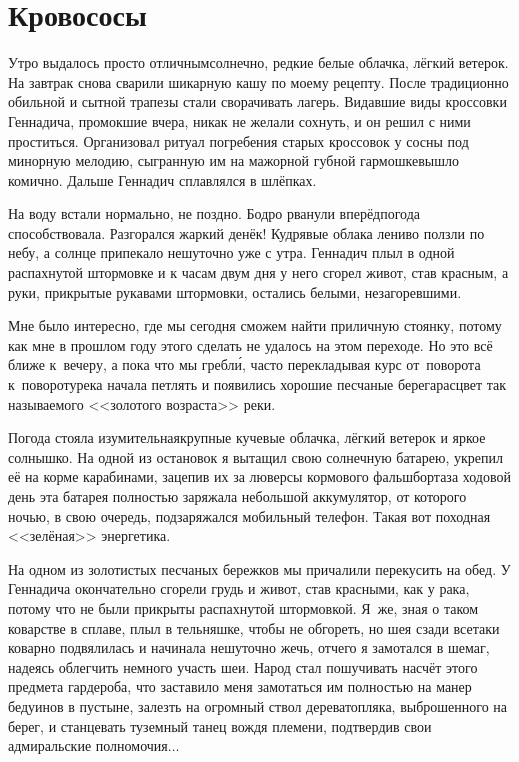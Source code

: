 \chapter{Кровососы} 
\vepsianrose

Утро выдалось просто отличным\mdash  солнечно, редкие белые облачка, лёгкий ветерок. На завтрак снова сварили шикарную кашу по моему рецепту. После традиционно обильной и сытной трапезы стали сворачивать лагерь. Видавшие виды кроссовки Геннадича, промокшие вчера, никак не желали сохнуть, и он решил с ними проститься. Организовал ритуал погребения старых кроссовок у сосны под минорную мелодию, сыгранную им на мажорной губной гармошке\mdash вышло комично. Дальше Геннадич сплавлялся в шлёпках. 

На воду встали нормально, не поздно.  Бодро рванули вперёд\mdash погода способствовала. Разгорался жаркий денёк! Кудрявые облака лениво ползли по небу, а солнце припекало нешуточно уже с утра. Геннадич плыл в одной распахнутой штормовке и к часам двум дня у него сгорел живот, став красным, а руки, прикрытые рукавами штормовки, остались белыми, незагоревшими.

\newpage
Мне было интересно, где мы сегодня сможем найти приличную стоянку, потому как мне в прошлом году этого сделать не удалось на этом переходе. Но это всё ближе к~вечеру, а пока что мы гребл\'{и}, часто перекладывая курс от~поворота к~повороту\mdash  река начала петлять и появились хорошие песчаные берега\mdash  расцвет так называемого <<золотого возраста>> реки.

Погода стояла изумительная\mdash крупные кучевые облачка, лёгкий ветерок и яркое солнышко. На одной из остановок я вытащил свою солнечную батарею, укрепил её на корме карабинами, зацепив их за люверсы кормового фальшборта\mdash за ходовой день эта батарея полностью заряжала небольшой аккумулятор, от которого ночью, в свою очередь, подзаряжался мобильный телефон. Такая вот походная <<зелёная>> энергетика.

На одном из золотистых песчаных бережков мы причалили перекусить на обед. У Геннадича окончательно сгорели грудь и живот, став красными, как у рака, потому что не были прикрыты распахнутой штормовкой. Я~же, зная о таком коварстве в сплаве, плыл в тельняшке, чтобы не обгореть, но шея сзади все\sdash таки коварно подвялилась и начинала нешуточно жечь, отчего я замотался в шемаг, надеясь облегчить немного участь шеи. Народ стал пошучивать насчёт этого предмета гардероба, что заставило меня замотаться им полностью на манер бедуинов в пустыне, залезть на огромный ствол дерева\sdash топляка, выброшенного на берег, и станцевать туземный танец вождя племени, подтвердив свои адмиральские полномочия$\ldots$

